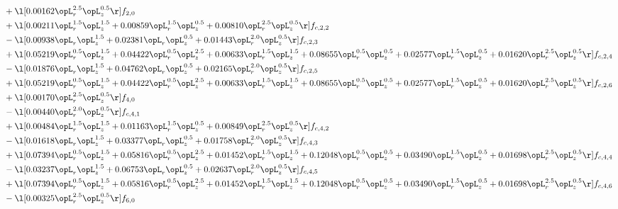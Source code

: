 \begin{alignat}{2}
& + \l[  0.00162 \opL_r^{2.5} \opL_z^{0.5}  \r] f_{2,0} \nonumber \\ 
& + \l[  0.00211 \opL_r^{1.5} \opL_z^{1.5} +  0.00859 \opL_r^{1.5} \opL_z^{0.5} +  0.00810 \opL_r^{2.5} \opL_z^{0.5}  \r] f_{c,2,2} \nonumber \\ 
& - \l[  0.00938 \opL_r \opL_z^{1.5} +  0.02381 \opL_r \opL_z^{0.5} +  0.01443 \opL_r^{2.0} \opL_z^{0.5}  \r] f_{c,2,3} \nonumber \\ 
& + \l[  0.05219 \opL_r^{0.5} \opL_z^{1.5} +  0.04422 \opL_r^{0.5} \opL_z^{2.5} +  0.00633 \opL_r^{1.5} \opL_z^{1.5} +  0.08655 \opL_r^{0.5} \opL_z^{0.5} +  0.02577 \opL_r^{1.5} \opL_z^{0.5} +  0.01620 \opL_r^{2.5} \opL_z^{0.5}  \r] f_{c,2,4} \nonumber \\ 
& - \l[  0.01876 \opL_r \opL_z^{1.5} +  0.04762 \opL_r \opL_z^{0.5} +  0.02165 \opL_r^{2.0} \opL_z^{0.5}  \r] f_{c,2,5} \nonumber \\ 
& + \l[  0.05219 \opL_r^{0.5} \opL_z^{1.5} +  0.04422 \opL_r^{0.5} \opL_z^{2.5} +  0.00633 \opL_r^{1.5} \opL_z^{1.5} +  0.08655 \opL_r^{0.5} \opL_z^{0.5} +  0.02577 \opL_r^{1.5} \opL_z^{0.5} +  0.01620 \opL_r^{2.5} \opL_z^{0.5}  \r] f_{c,2,6} \nonumber \\ 
& + \l[  0.00170 \opL_r^{2.5} \opL_z^{0.5}  \r] f_{4,0} \nonumber \\ 
& - \l[  0.00440 \opL_r^{2.0} \opL_z^{0.5}  \r] f_{c,4,1} \nonumber \\ 
& + \l[  0.00484 \opL_r^{1.5} \opL_z^{1.5} +  0.01163 \opL_r^{1.5} \opL_z^{0.5} +  0.00849 \opL_r^{2.5} \opL_z^{0.5}  \r] f_{c,4,2} \nonumber \\ 
& - \l[  0.01618 \opL_r \opL_z^{1.5} +  0.03377 \opL_r \opL_z^{0.5} +  0.01758 \opL_r^{2.0} \opL_z^{0.5}  \r] f_{c,4,3} \nonumber \\ 
& + \l[  0.07394 \opL_r^{0.5} \opL_z^{1.5} +  0.05816 \opL_r^{0.5} \opL_z^{2.5} +  0.01452 \opL_r^{1.5} \opL_z^{1.5} +  0.12048 \opL_r^{0.5} \opL_z^{0.5} +  0.03490 \opL_r^{1.5} \opL_z^{0.5} +  0.01698 \opL_r^{2.5} \opL_z^{0.5}  \r] f_{c,4,4} \nonumber \\ 
& - \l[  0.03237 \opL_r \opL_z^{1.5} +  0.06753 \opL_r \opL_z^{0.5} +  0.02637 \opL_r^{2.0} \opL_z^{0.5}  \r] f_{c,4,5} \nonumber \\ 
& + \l[  0.07394 \opL_r^{0.5} \opL_z^{1.5} +  0.05816 \opL_r^{0.5} \opL_z^{2.5} +  0.01452 \opL_r^{1.5} \opL_z^{1.5} +  0.12048 \opL_r^{0.5} \opL_z^{0.5} +  0.03490 \opL_r^{1.5} \opL_z^{0.5} +  0.01698 \opL_r^{2.5} \opL_z^{0.5}  \r] f_{c,4,6} \nonumber \\ 
& - \l[  0.00325 \opL_r^{2.5} \opL_z^{0.5}  \r] f_{6,0} \nonumber \\ 

\end{alignat}

